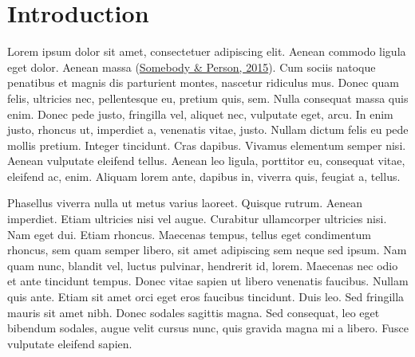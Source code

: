 \documentclass[]{cik}%
\begin{document}
\providecommand{\tightlist}{%
  \setlength{\itemsep}{0pt}\setlength{\parskip}{0pt}}
\providecommand{\EndFirstPage}{%
}


\maketitle

\newpage\ifdefined\Shaded\renewenvironment{Shaded}{\begin{tcolorbox}[interior hidden, boxrule=0pt, borderline west={3pt}{0pt}{shadecolor}, enhanced, breakable, frame hidden, sharp corners]}{\end{tcolorbox}}\fi

\hypertarget{introduction}{%
\section{Introduction}\label{introduction}}

Lorem ipsum dolor sit amet, consectetuer adipiscing elit. Aenean commodo
ligula eget dolor. Aenean massa
(\protect\hyperlink{ref-CreativeTag1}{Somebody \& Person, 2015}). Cum
sociis natoque penatibus et magnis dis parturient montes, nascetur
ridiculus mus. Donec quam felis, ultricies nec, pellentesque eu, pretium
quis, sem. Nulla consequat massa quis enim. Donec pede justo, fringilla
vel, aliquet nec, vulputate eget, arcu. In enim justo, rhoncus ut,
imperdiet a, venenatis vitae, justo. Nullam dictum felis eu pede mollis
pretium. Integer tincidunt. Cras dapibus. Vivamus elementum semper nisi.
Aenean vulputate eleifend tellus. Aenean leo ligula, porttitor eu,
consequat vitae, eleifend ac, enim. Aliquam lorem ante, dapibus in,
viverra quis, feugiat a, tellus.

Phasellus viverra nulla ut metus varius laoreet. Quisque rutrum. Aenean
imperdiet. Etiam ultricies nisi vel augue. Curabitur ullamcorper
ultricies nisi. Nam eget dui. Etiam rhoncus. Maecenas tempus, tellus
eget condimentum rhoncus, sem quam semper libero, sit amet adipiscing
sem neque sed ipsum. Nam quam nunc, blandit vel, luctus pulvinar,
hendrerit id, lorem. Maecenas nec odio et ante tincidunt tempus. Donec
vitae sapien ut libero venenatis faucibus. Nullam quis ante. Etiam sit
amet orci eget eros faucibus tincidunt. Duis leo. Sed fringilla mauris
sit amet nibh. Donec sodales sagittis magna. Sed consequat, leo eget
bibendum sodales, augue velit cursus nunc, quis gravida magna mi a
libero. Fusce vulputate eleifend sapien.
\end{document}
